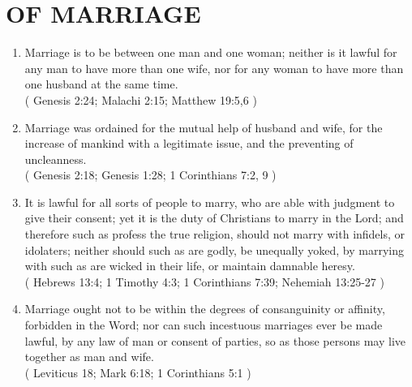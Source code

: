\documentclass[12pt,a4paper]{book}
\begin{document}
\chapter{OF MARRIAGE}
\label{ch-mar}
\begin{enumerate}
\item Marriage is to be between one man and one woman; neither is it lawful for any man to have more than one wife, nor for any woman to have more than one husband at the same time.\\
( Genesis 2:24; Malachi 2:15; Matthew 19:5,6 )
\item Marriage was ordained for the mutual help of husband and wife, for the increase of mankind with a legitimate issue, and the preventing of uncleanness.\\
( Genesis 2:18; Genesis 1:28; 1 Corinthians 7:2, 9 )
\item It is lawful for all sorts of people to marry, who are able with judgment to give their consent; yet it is the duty of Christians to marry in the Lord; and therefore such as profess the true religion, should not marry with infidels, or idolaters; neither should such as are godly, be unequally yoked, by marrying with such as are wicked in their life, or maintain damnable heresy.\\
( Hebrews 13:4; 1 Timothy 4:3; 1 Corinthians 7:39; Nehemiah 13:25-27 )
\item Marriage ought not to be within the degrees of consanguinity or affinity, forbidden in the Word; nor can such incestuous marriages ever be made lawful, by any law of man or consent of parties, so as those persons may live together as man and wife.\\
( Leviticus 18; Mark 6:18; 1 Corinthians 5:1 )
\end{enumerate}
\end{document}
